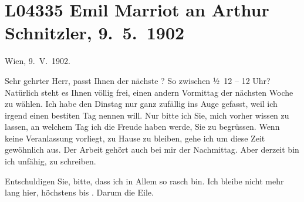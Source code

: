 

\section[Emil Marriot an Arthur Schnitzler, 9. 5. 1902]{L04335 Emil Marriot an Arthur Schnitzler, 9. 5. 1902}
\nopagebreak{}
\rehead{ }\normalsize\beginnumbering{}
\toendnotes[C]{\smallbreak\pagebreak[2]}
\toendnotes[C]{\smallbreak}
\toendnotes[C]{\smallbreak}
\pstart
           \raggedleft{}{\pb}Wien, 9. V. 1902.\pend
           
\pstart{}Sehr gehrter Herr,\pend\vspace{0.5em}
\pstart
           passt Ihnen der nächste \label{K_L04335-1v}\label{K_L04335-1}? So
               zwischen ½ 12 – 12 Uhr? Natürlich steht es Ihnen völlig frei, einen andern Vormittag
               der nächsten Woche zu wählen. Ich habe den Dinstag nur ganz zufällig ins Auge
               gefasst, weil ich irgend einen besti{\geminationm}ten Tag nennen
               will. Nur bitte ich Sie, mich vorher wissen zu lassen, an welchem Tag ich die Freude
               haben werde, Sie zu begrüssen. Wenn keine Veranlassung vorliegt, {\pb}zu Hause zu bleiben, gehe ich um diese Zeit gewöhnlich
               aus. Der Arbeit gehört auch bei mir der Nachmittag. Aber derzeit bin ich unfähig, zu
               schreiben.\pend
           
\pstart
           Entschuldigen Sie, bitte, dass ich in Allem so rasch bin. Ich bleibe nicht mehr lang
               hier, höchstens bis \label{K_L04335-2v}\label{K_L04335-2}. Darum die Eile.\pend
           
